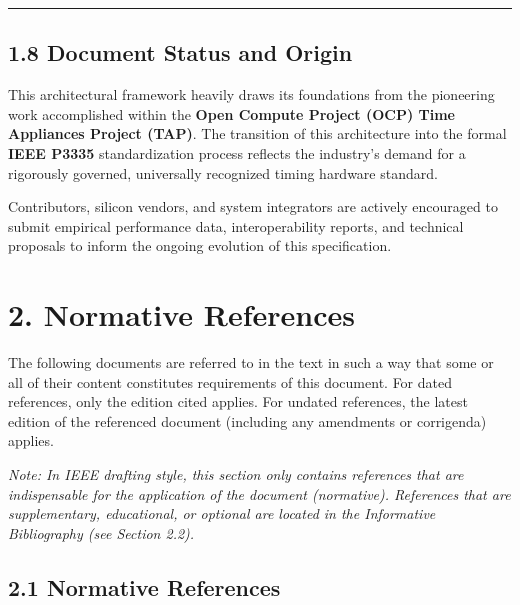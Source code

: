 \begin{center}\rule{0.5\linewidth}{0.5pt}\end{center}

\subsection{1.8 Document Status and
Origin}\label{document-status-and-origin}

This architectural framework heavily draws its foundations from the
pioneering work accomplished within the \textbf{Open Compute Project
(OCP) Time Appliances Project (TAP)}. The transition of this
architecture into the formal \textbf{IEEE P3335} standardization process
reflects the industry's demand for a rigorously governed, universally
recognized timing hardware standard.

Contributors, silicon vendors, and system integrators are actively
encouraged to submit empirical performance data, interoperability
reports, and technical proposals to inform the ongoing evolution of this
specification.

\section{2. Normative References}\label{normative-references}

The following documents are referred to in the text in such a way that
some or all of their content constitutes requirements of this document.
For dated references, only the edition cited applies. For undated
references, the latest edition of the referenced document (including any
amendments or corrigenda) applies.

\emph{Note: In IEEE drafting style, this section only contains
references that are indispensable for the application of the document
(normative). References that are supplementary, educational, or optional
are located in the Informative Bibliography (see Section 2.2).}

\subsection{2.1 Normative References}\label{normative-references-1}

